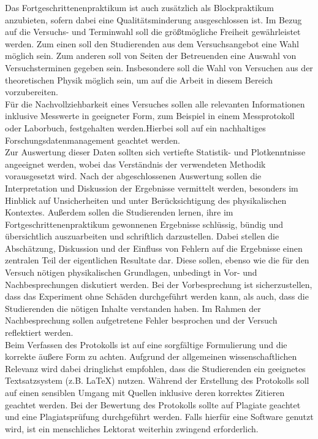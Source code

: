 ﻿\documentclass[DIV=calc]{scrartcl}
\begin{document}
Das Fortgeschrittenenpraktikum ist auch zusätzlich als Blockpraktikum anzubieten, sofern dabei eine Qualitätsminderung ausgeschlossen ist. Im Bezug auf die Versuchs- und Terminwahl soll die größtmögliche Freiheit gewährleistet werden. Zum einen soll den Studierenden aus dem Versuchsangebot eine Wahl möglich sein. Zum anderen soll von Seiten der Betreuenden eine Auswahl von Versuchsterminen gegeben sein. Insbesondere soll die Wahl von Versuchen aus der theoretischen Physik möglich sein, um auf die Arbeit in diesem Bereich vorzubereiten.\\[-0.25cm]

Für die Nachvollziehbarkeit eines Versuches sollen alle relevanten Informationen inklusive Messwerte in geeigneter Form, zum Beispiel in einem Messprotokoll oder Laborbuch, festgehalten werden.Hierbei soll auf ein nachhaltiges Forschungsdatenmanagement geachtet werden.\\[-0.25cm]

Zur Auswertung dieser Daten sollten sich vertiefte Statistik- und Plotkenntnisse angeeignet werden, wobei das Verständnis der verwendeten Methodik vorausgesetzt wird. Nach der abgeschlossenen Auswertung sollen die Interpretation und Diskussion der Ergebnisse vermittelt werden, besonders im Hinblick auf Unsicherheiten und unter Berücksichtigung des physikalischen Kontextes. Außerdem sollen die Studierenden lernen, ihre im Fortgeschrittenenpraktikum gewonnenen Ergebnisse schlüssig, bündig und übersichtlich auszuarbeiten und schriftlich darzustellen. Dabei stellen die Abschätzung, Diskussion und der Einfluss von Fehlern auf die Ergebnisse einen zentralen Teil der eigentlichen Resultate dar. Diese sollen, ebenso wie die für den Versuch nötigen physikalischen Grundlagen, unbedingt in Vor- und Nachbesprechungen diskutiert werden. Bei der Vorbesprechung ist sicherzustellen, dass das Experiment ohne Schäden durchgeführt werden kann, als auch, dass die Studierenden die nötigen Inhalte verstanden haben. Im Rahmen der Nachbesprechung sollen aufgetretene Fehler besprochen und der Versuch reflektiert werden.\\[-0.25cm]

Beim Verfassen des Protokolls ist auf eine sorgfältige Formulierung und die korrekte äußere Form zu achten. Aufgrund der allgemeinen wissenschaftlichen Relevanz wird dabei dringlichst empfohlen, dass die Studierenden ein geeignetes Textsatzsystem (z.B. LaTeX) nutzen. Während der Erstellung des Protokolls soll auf einen sensiblen Umgang mit Quellen inklusive deren korrektes Zitieren geachtet werden. Bei der Bewertung des Protokolls sollte auf Plagiate geachtet und eine Plagiatsprüfung durchgeführt werden. Falls hierfür eine Software genutzt wird, ist ein menschliches Lektorat weiterhin zwingend erforderlich.\\[-0.25cm]
\end{document}
